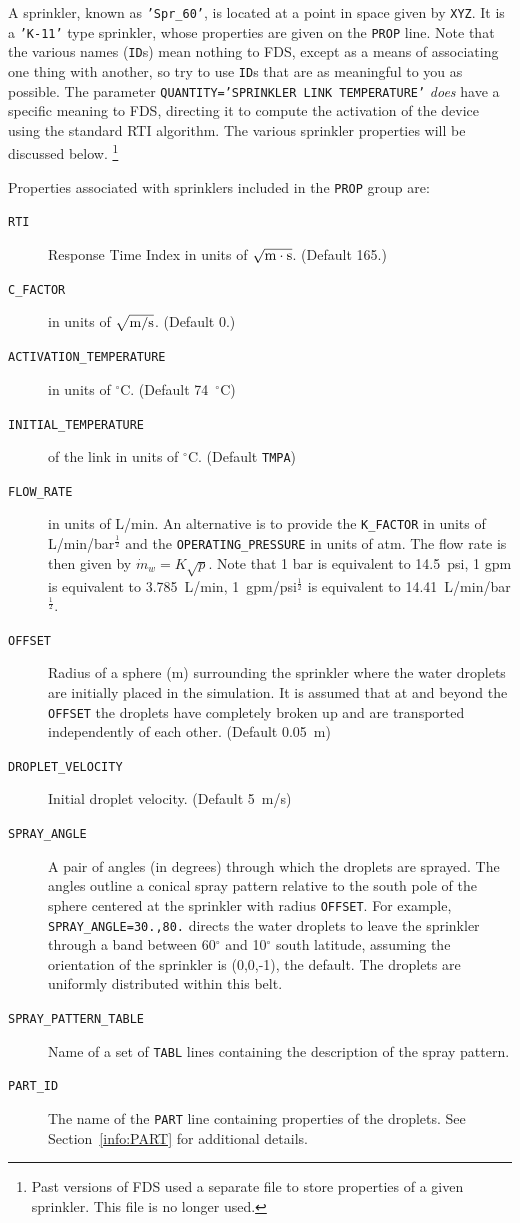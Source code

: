 \documentclass[11pt]{book}
\newcommand{\ct}{\tt\small}
\newcommand{\dm}{\dot{m}}
\newcommand{\ha}{\frac{1}{2}}
\begin{document}
\noindent
A sprinkler, known as {\ct 'Spr\_60'}, is located at a point in space given by {\ct XYZ}. It is a {\ct 'K-11'} type sprinkler, whose properties are given on
the {\ct PROP} line. Note that the various names ({\ct ID}s) mean nothing to FDS, except as a means of associating one thing with another, so try to use {\ct ID}s that are as
meaningful to you as possible.  The parameter {\ct QUANTITY='SPRINKLER LINK TEMPERATURE'} {\em does} have a specific meaning to FDS, directing it to compute the activation of
the device using the standard RTI algorithm. The various sprinkler properties will be discussed below.
\footnote{Past versions of FDS used a separate file to store
properties of a given sprinkler. This file is no longer used.}

Properties associated with sprinklers included in the {\ct PROP} group are:
\begin{description}
\item[{\ct RTI}] Response Time Index in units of $\sqrt{\hbox{m}\cdot \hbox{s}}$. (Default 165.)
\item[{\ct C\_FACTOR}] in units of $\sqrt{\hbox{m/s}}$. (Default 0.)
\item[{\ct ACTIVATION\_TEMPERATURE}] in units of $^\circ$C. (Default 74~$^\circ$C)
\item[{\ct INITIAL\_TEMPERATURE}] of the link in units of $^\circ$C. (Default {\ct TMPA})
\item[{\ct FLOW\_RATE}] in units of L/min.
An alternative is to provide the {\ct K\_FACTOR} in units of L/min/bar$^\ha$ and the
{\ct OPERATING\_PRESSURE} in units of atm.
The flow rate is then given by $ \dm_w = K \sqrt{p}$. Note that 1 bar is equivalent to
14.5~psi, 1 gpm is equivalent to 3.785~L/min, 1~gpm/psi$^\ha$ is
equivalent to 14.41~L/min/bar$^\ha$.
\item[{\ct OFFSET}] Radius of a sphere (m) surrounding the
sprinkler where the water droplets are initially placed in the simulation. It is assumed that
at and beyond the {\ct OFFSET} the droplets have completely broken
up and are transported independently of each other. (Default 0.05~m)
\item[{\ct DROPLET\_VELOCITY}]  Initial droplet velocity. (Default 5~m/s)
\item[{\ct SPRAY\_ANGLE}] A pair of angles (in degrees) through which the droplets are sprayed.
The angles outline a conical spray pattern relative to the
south pole of the sphere centered at the sprinkler with radius {\ct OFFSET}.
For example, {\ct SPRAY\_ANGLE=30.,80.} directs the water droplets to leave
the sprinkler through a band between 60$^\circ$ and 10$^\circ$ south latitude, assuming the orientation of
the sprinkler is (0,0,-1), the default. The droplets are uniformly
distributed within this belt.
\item[{\ct SPRAY\_PATTERN\_TABLE}] Name of a set of {\ct TABL} lines containing the description of the spray pattern.
\item[{\ct PART\_ID}] The name of the {\ct PART} line containing properties of the droplets.
See Section~\ref{info:PART} for additional details.
\end{description}
\end{document}
